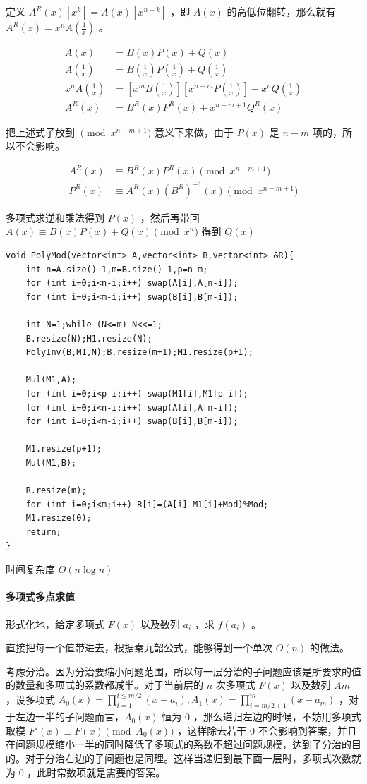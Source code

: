 \documentclass[UTF-8]{ctexart}
\begin{document}
	定义 $A^R(x)[x^k]=A(x)[x^{n-k}]$ ，即 $A(x)$ 的高低位翻转，那么就有 $A^R(x)=x^nA(\frac{1}{x})$ 。
	
	\begin{align}
	A(x)&=B(x)P(x)+Q(x)\nonumber \\
	A(\frac{1}{x})&=B(\frac{1}{x})P(\frac{1}{x})+Q(\frac{1}{x})\nonumber \\
	x^nA(\frac{1}{x})&=[x^mB(\frac{1}{x})][x^{n-m}P(\frac{1}{x})]+x^nQ(\frac{1}{x})\nonumber\\A^R(x)&=B^R(x)P^R(x)+x^{n-m+1}Q^R(x)\nonumber
	\end{align}
	
	把上述式子放到 $\pmod{x^{n-m+1}}$ 意义下来做，由于 $P(x)$ 是 $n-m$ 项的，所以不会影响。
	
	\begin{align}
	A^R(x)&\equiv B^R(x)P^R(x) \pmod{x^{n-m+1}}\nonumber\\
	P^R(x)&\equiv A^R(x) (B^R)^{-1}(x) \pmod{x^{n-m+1}}\nonumber
	\end{align}
	
	多项式求逆和乘法得到 $P(x)$ ，然后再带回 $A(x)\equiv B(x)P(x)+Q(x) \pmod{x^n}$ 得到 $Q(x)$
\begin{verbatim}
void PolyMod(vector<int> A,vector<int> B,vector<int> &R){
    int n=A.size()-1,m=B.size()-1,p=n-m;
    for (int i=0;i<n-i;i++) swap(A[i],A[n-i]);
    for (int i=0;i<m-i;i++) swap(B[i],B[m-i]);
    
    int N=1;while (N<=m) N<<=1;
    B.resize(N);M1.resize(N);
    PolyInv(B,M1,N);B.resize(m+1);M1.resize(p+1);
    
    Mul(M1,A);
    for (int i=0;i<p-i;i++) swap(M1[i],M1[p-i]);
    for (int i=0;i<n-i;i++) swap(A[i],A[n-i]);
    for (int i=0;i<m-i;i++) swap(B[i],B[m-i]);
    
    M1.resize(p+1);
    Mul(M1,B);
    
    R.resize(m);
    for (int i=0;i<m;i++) R[i]=(A[i]-M1[i]+Mod)%Mod;
    M1.resize(0);
    return;
}
\end{verbatim}
	时间复杂度 $O(n\log n)$
	\paragraph{多项式多点求值} 形式化地，给定多项式 $F(x)$ 以及数列 $a _ i$ ，求 $f(a_i)$ 。
	
	直接把每一个值带进去，根据秦九韶公式，能够得到一个单次 $O(n)$ 的做法。
	
	考虑分治。因为分治要缩小问题范围，所以每一层分治的子问题应该是所要求的值的数量和多项式的系数都减半。对于当前层的 $n$ 次多项式 $F(x)$ 以及数列 $Am$ ，设多项式 $A_0(x)=\prod _ {i=1} ^ {i \le m/2} (x-a _ i),A_1(x)=\prod_ {i=m/2+1}^m (x-a_m)$ ，对于左边一半的子问题而言，$A_0(x)$ 恒为 $0$ ，那么递归左边的时候，不妨用多项式取模 $F'(x) \equiv F(x) \pmod{A_0(x)}$ ，这样除去若干 $0$ 不会影响到答案，并且在问题规模缩小一半的同时降低了多项式的系数不超过问题规模，达到了分治的目的。对于分治右边的子问题也是同理。这样当递归到最下面一层时，多项式次数就为 $0$ ，此时常数项就是需要的答案。
	
\end{document}
